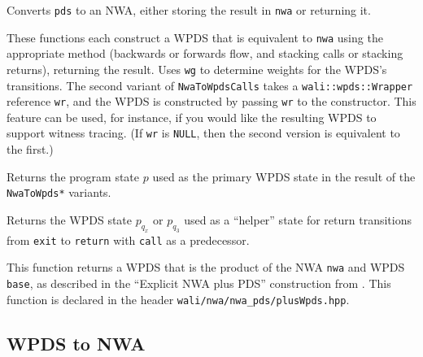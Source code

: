 \begin{functionlist}
    Converts \texttt{pds} to an NWA, either storing the result in
    \texttt{nwa} or returning it.

\clearpage
    These functions each construct a WPDS that is equivalent to \texttt{nwa} using the
    appropriate method (backwards or forwards flow, and stacking calls or
    stacking returns), returning the result. Uses \texttt{wg} to determine
    weights for the WPDS's transitions. The second variant of
    \texttt{NwaToWpdsCalls} takes a \texttt{wali::wpds::Wrapper} reference
    \texttt{wr}, and the WPDS is constructed by passing \texttt{wr} to the
    constructor. This feature can be used, for instance, if you would like the
    resulting WPDS to support witness tracing. (If \texttt{wr} is
    \texttt{NULL}, then the second version is equivalent to the first.)

    Returns the program state $p$ used as the primary WPDS state in the
    result of the \texttt{NwaToWpds*} variants.

    Returns the WPDS state $p_{q_x}$ or $p_{q_3}$ used as a ``helper'' state
    for return transitions from \texttt{exit} to \texttt{return} with
    \texttt{call} as a predecessor.

    This function returns a WPDS that is the
    product of the NWA \texttt{nwa} and WPDS \texttt{base}, as described in the ``Explicit
    NWA plus PDS'' construction from \cite[\S6]{advancedquerying}. This
    function is declared in the header
    \texttt{wali/nwa/nwa\_pds/plusWpds.hpp}.
\end{functionlist}


\subsection{WPDS to NWA}
\label{Se:WpdsToNwa}

